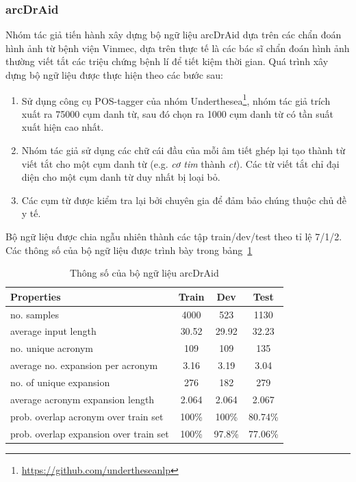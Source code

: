 \subsubsection{arcDrAid}
Nhóm tác giả tiến hành xây dựng bộ ngữ liệu arcDrAid dựa trên các chẩn đoán hình ảnh từ bệnh viện Vinmec, dựa trên thực tế là các bác sĩ chẩn đoán hình ảnh thường viết tắt các triệu chứng bệnh lí để tiết kiệm thời gian. Quá trình xây dựng bộ ngữ liệu được thực hiện theo các bước sau:
\begin{enumerate}
\item Sử dụng công cụ POS-tagger của nhóm Underthesea\footnote{\href{https://github.com/undertheseanlp}{https://github.com/undertheseanlp}}, nhóm tác giả trích xuất ra 75000 cụm danh từ, sau đó chọn ra 1000 cụm danh từ có tần suất xuất hiện cao nhất.
\item Nhóm tác giả sử dụng các chữ cái đầu của mỗi âm tiết ghép lại tạo thành từ viết tắt cho một cụm danh từ (e.g. \textit{cơ tim} thành \textit{ct}). Các từ viết tắt chỉ đại diện cho một cụm danh từ duy nhất bị loại bỏ.
\item Các cụm từ được kiểm tra lại bởi chuyên gia để đảm bảo chúng thuộc chủ đề y tế.
\end{enumerate}
Bộ ngữ liệu được chia ngẫu nhiên thành các tập train/dev/test theo tỉ lệ 7/1/2. Các thông số của bộ ngữ liệu được trình bày trong bảng~\ref{tab:arcdraid-stats}
\begin{table}
\centering
\begin{tabular}{|p{3.75cm}|c|c|c|}
\hline
\textbf{Properties} & \textbf{Train} & \textbf{Dev} & \textbf{Test} \\ \hline
no. samples & 4000 & 523 & 1130 \\ \hline
average input length & 30.52 & 29.92 & 32.23 \\ \hline
no. unique acronym & 109 & 109 & 135 \\ \hline
average no. expansion per acronym & 3.16 & 3.19 & 3.04 \\ \hline
no. of unique expansion & 276 & 182 & 279 \\ \hline
average acronym expansion length & 2.064 & 2.064 & 2.067 \\ \hline
prob. overlap acronym over train set & 100\% & 100\% & 80.74\% \\ \hline
prob. overlap expansion over train set & 100\% & 97.8\% & 77.06\% \\ \hline
\end{tabular}
\caption{Thông số của bộ ngữ liệu arcDrAid\cite{minh-EtAl:2022:LREC}}
\label{tab:arcdraid-stats}
\end{table}

